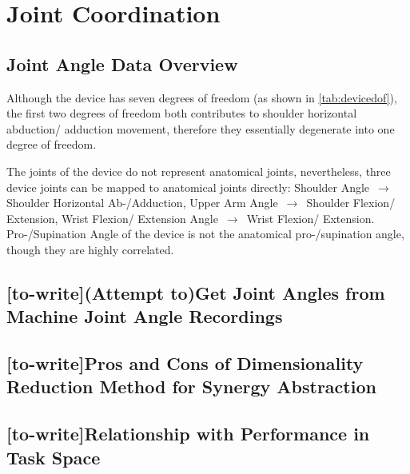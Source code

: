 \section{Joint Coordination}

\subsection{Joint Angle Data Overview}
Although the device has seven degrees of freedom (as shown in \ref{tab:devicedof}), the first two degrees of freedom both contributes to shoulder horizontal abduction/ adduction movement, therefore they essentially degenerate into one degree of freedom.

The joints of the device do not represent anatomical joints, nevertheless, three device joints can be mapped to anatomical joints directly: Shoulder Angle $\,\to\,$ Shoulder Horizontal Ab-/Adduction, Upper Arm Angle $\,\to\,$ Shoulder Flexion/ Extension, Wrist Flexion/ Extension Angle $\,\to\,$ Wrist Flexion/ Extension. Pro-/Supination Angle of the device is not the anatomical pro-/supination angle, though they are highly correlated.


\subsection{[to-write](Attempt to)Get Joint Angles from Machine Joint Angle Recordings }
\subsection{[to-write]Pros and Cons of Dimensionality Reduction Method for Synergy Abstraction}
\subsection{[to-write]Relationship with Performance in Task Space}
